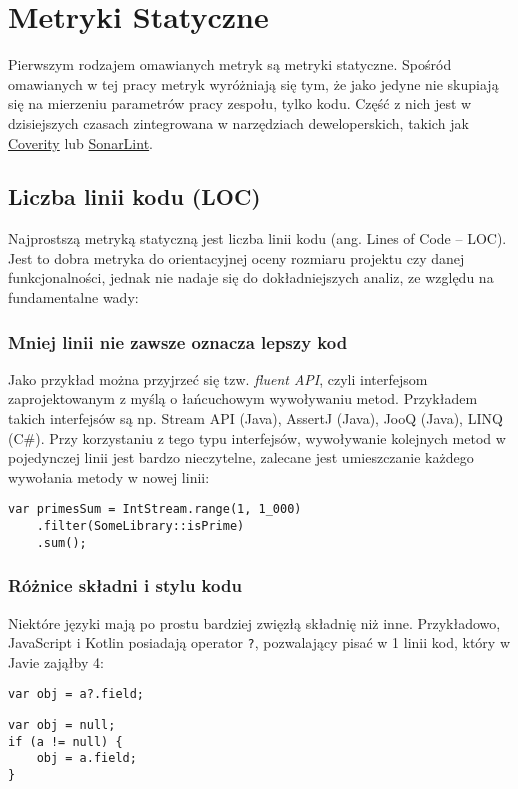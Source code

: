 \newpage
\section{Metryki Statyczne}
Pierwszym rodzajem omawianych metryk są metryki statyczne. Spośród omawianych w tej pracy metryk wyróżniają się tym,
że jako jedyne nie skupiają się na mierzeniu parametrów pracy zespołu, tylko kodu.
Część z nich jest w dzisiejszych czasach zintegrowana w narzędziach deweloperskich, takich jak \href{https://www.synopsys.com/software-integrity/static-analysis-tools-sast/coverity.html}{Coverity}
lub \href{https://www.sonarsource.com/products/sonarlint/}{SonarLint}.

\subsection{Liczba linii kodu (LOC)}
Najprostszą metryką statyczną jest liczba linii kodu (ang. Lines of Code -- LOC).
Jest to dobra metryka do orientacyjnej oceny rozmiaru projektu czy danej funkcjonalności, jednak nie nadaje
się do dokładniejszych analiz, ze względu na fundamentalne wady:

\subsubsection*{Mniej linii nie zawsze oznacza lepszy kod}
Jako przykład można przyjrzeć się tzw. \textit{fluent API}, czyli interfejsom zaprojektowanym z myślą o łańcuchowym wywoływaniu metod.
Przykładem takich interfejsów są np. Stream API (Java), AssertJ (Java), JooQ (Java), LINQ (C\#).
Przy korzystaniu z tego typu interfejsów, wywoływanie kolejnych metod w pojedynczej linii jest bardzo nieczytelne, zalecane jest
umieszczanie każdego wywołania metody w nowej linii:
\begin{lstlisting}[caption=Sumowanie liczb pierwszych przy użyciu Stream API (Java)]
var primesSum = IntStream.range(1, 1_000)
    .filter(SomeLibrary::isPrime)
    .sum();
\end{lstlisting}

\subsubsection*{Różnice składni i stylu kodu}
Niektóre języki mają po prostu bardziej zwięzłą składnię niż inne.
Przykładowo, JavaScript i Kotlin posiadają operator \texttt{?}, pozwalający pisać w 1 linii kod, który w Javie zająłby 4:
\begin{lstlisting}[caption=Przykład obsługi null (Kotlin)]
var obj = a?.field;
\end{lstlisting}
\begin{lstlisting}[caption=Przykład obsługi null (Java)]
var obj = null;
if (a != null) {
    obj = a.field;
}
\end{lstlisting}

